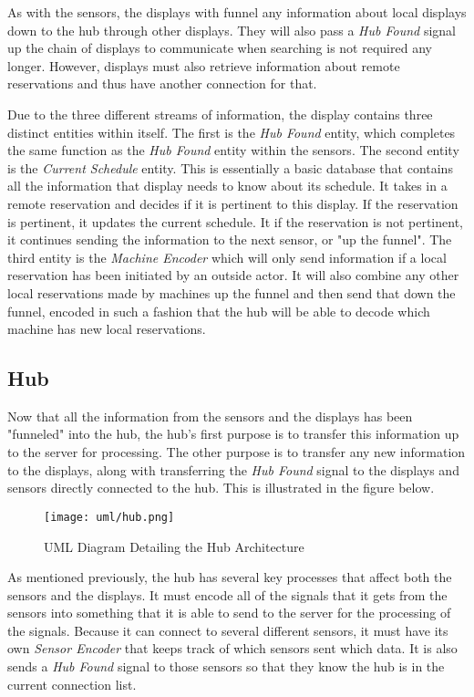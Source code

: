 \documentclass[PPFS.tex]{template/subfiles}
\begin{document}
As with the sensors, the displays with funnel any information about local displays down to the hub through other displays. They will also pass a \textit{Hub Found} signal up the chain of displays to communicate when searching is not required any longer. However, displays must also retrieve information about remote reservations and thus have another connection for that.

Due to the three different streams of information, the display contains three distinct entities within itself. The first is the \textit{Hub Found} entity, which completes the same function as the \textit{Hub Found} entity within the sensors. The second entity is the \textit{Current Schedule} entity. This is essentially a basic database that contains all the information that display needs to know about its schedule. It takes in a remote reservation and decides if it is pertinent to this display. If the reservation is pertinent, it updates the current schedule. It if the reservation is not pertinent, it continues sending the information to the next sensor, or "up the funnel". The third entity is the \textit{Machine Encoder} which will only send information if a local reservation has been initiated by an outside actor. It will also combine any other local reservations made by machines up the funnel and then send that down the funnel, encoded in such a fashion that the hub will be able to decode which machine has new local reservations.

\subsection{Hub}

Now that all the information from the sensors and the displays has been "funneled" into the hub, the hub's first purpose is to transfer this information up to the server for processing. The other purpose is to transfer any new information to the displays, along with transferring the \textit{Hub Found} signal to the displays and sensors directly connected to the hub. This is illustrated in the figure below.

\begin{figure}[H]
    \centering
    \texttt{[image: uml/hub.png]}
    \caption{UML Diagram Detailing the Hub Architecture}
\end{figure}

As mentioned previously, the hub has several key processes that affect both the sensors and the displays. It must encode all of the signals that it gets from the sensors into something that it is able to send to the server for the processing of the signals. Because it can connect to several different sensors, it must have its own \textit{Sensor Encoder} that keeps track of which sensors sent which data. It is also sends a \textit{Hub Found} signal to those sensors so that they know the hub is in the current connection list.
\end{document}
